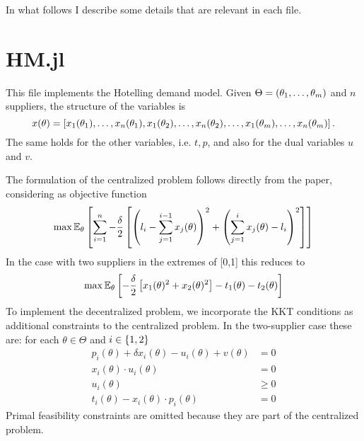 \documentclass[11pt, oneside]{article}
\begin{document}
In what follows I describe some details that are relevant in each file.

\section{HM.jl}
This file implements the Hotelling demand model. Given \(\Theta = \left(\theta_1, \ldots, \theta_m\right)\) and \(n\) suppliers, the structure of the variables
is
\[
x(\theta) = \left[x_1(\theta_1), \ldots, x_n(\theta_1), x_1(\theta_2), \ldots, x_n(\theta_2), \ldots, x_1(\theta_m), \ldots, x_n(\theta_m)\right].
\]
The same holds for the other variables, i.e. \(t, p\), and also for the dual variables \(u\) and \(v\).

The formulation of the centralized problem follows directly from the paper, considering as objective function
\[
\max \mathbb{E}_{\theta}\left[\sum_{i=1}^n
-\frac{\delta}{2}\left[ \left(l_i-\sum_{j=1}^{i-1} x_j(\theta)\right)^2 + \left(\sum_{j=1}^{i} x_j(\theta) - l_i\right)^2  \right] \right]
\]
In the case with two suppliers in the extremes of [0,1] this reduces to
\[
\max \mathbb{E}_{\theta}\left[
-\frac{\delta}{2}\left[ x_1(\theta)^2 + x_2(\theta)^2\right] - t_1(\theta) - t_2(\theta) \right]
\]
To implement the decentralized problem, we incorporate the KKT conditions as
additional constraints to the centralized problem. In the two-supplier case these are: for each \(\theta \in \Theta\) and \(i\in \left\{1,2\right\}\)
\[
\begin{split}
    p_i(\theta) + \delta x_i(\theta) - u_i(\theta) + v(\theta) &= 0 \\
    x_i(\theta)\cdot u_i(\theta) &= 0 \\
    u_i(\theta) & \geq 0 \\
    t_i(\theta) - x_i(\theta)\cdot p_i(\theta) &= 0
\end{split}
\]
Primal feasibility constraints are omitted because they are part of the centralized problem.
\end{document}
